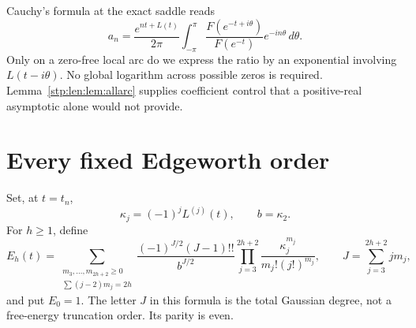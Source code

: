 \documentclass[11pt]{article}
\theoremstyle{remark}\newtheorem{remark}[theorem]{Remark}
\begin{document}
Cauchy's formula at the exact saddle reads
\begin{equation}\label{stp:len:eq:cauchy}
 a_n=\frac{e^{nt+L(t)}}{2\pi}\int_{-\pi}^{\pi}
 \frac{F(e^{-t+i\theta})}{F(e^{-t})}e^{-in\theta}\,d\theta.
\end{equation}
Only on a zero-free local arc do we express the ratio by an exponential involving $L(t-i\theta)$. No global logarithm across possible zeros is required. Lemma~\ref{stp:len:lem:allarc} supplies coefficient control that a positive-real asymptotic alone would not provide.

\section{Every fixed Edgeworth order}\label{stp:len:sec:edgeworth}
Set, at $t=t_n$,
\[
 \kappa_j=(-1)^jL^{(j)}(t),\qquad b=\kappa_2.
\]
For $h\ge1$, define
\begin{equation}\label{stp:len:eq:Etuple}
 E_h(t)=\sum_{\substack{m_3,\ldots,m_{2h+2}\ge0\\
                 \sum(j-2)m_j=2h}}
 \frac{(-1)^{J/2}(J-1)!!}{b^{J/2}}
 \prod_{j=3}^{2h+2}\frac{\kappa_j^{m_j}}{m_j!(j!)^{m_j}},
 \qquad J=\sum_{j=3}^{2h+2}jm_j,
\end{equation}
and put $E_0=1$. The letter $J$ in this formula is the total Gaussian degree, not a free-energy truncation order. Its parity is even.
\end{document}
